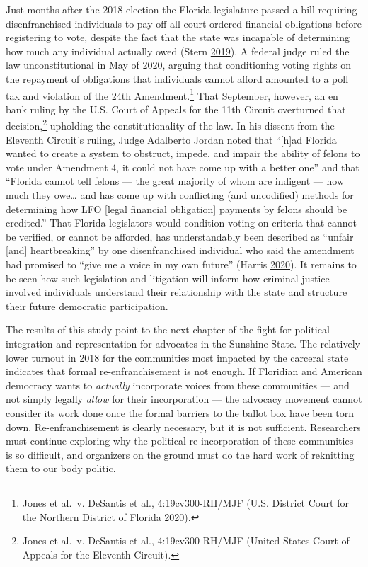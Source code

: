 \documentclass[
  12pt,
]{article}
\begin{document}
Just months after the 2018 election the Florida legislature passed a bill requiring disenfranchised individuals to pay off all court-ordered financial obligations before registering to vote, despite the fact that the state was incapable of determining how much any individual actually owed (Stern \protect\hyperlink{ref-Stern2019}{2019}). A federal judge ruled the law unconstitutional in May of 2020, arguing that conditioning voting rights on the repayment of obligations that individuals cannot afford amounted to a poll tax and violation of the 24th Amendment.\footnote{Jones et al.~v. DeSantis et al., 4:19cv300-RH/MJF (U.S. District Court for the Northern District of Florida 2020).} That September, however, an en bank ruling by the U.S. Court of Appeals for the 11th Circuit overturned that decision,\footnote{Jones et al.~v. DeSantis et al., 4:19cv300-RH/MJF (United States Court of Appeals for the Eleventh Circuit).} upholding the constitutionality of the law. In his dissent from the Eleventh Circuit's ruling, Judge Adalberto Jordan noted that ``{[}h{]}ad Florida wanted to create a system to obstruct, impede, and impair the ability of felons to vote under Amendment 4, it could not have come up with a better one'' and that ``Florida cannot tell felons --- the great majority of whom are indigent --- how much they owe\ldots{} and has come up with conflicting (and uncodified) methods for determining how LFO {[}legal financial obligation{]} payments by felons should be credited.'' That Florida legislators would condition voting on criteria that cannot be verified, or cannot be afforded, has understandably been described as ``unfair {[}and{]} heartbreaking'' by one disenfranchised individual who said the amendment had promised to ``give me a voice in my own future'' (Harris \protect\hyperlink{ref-Harris2020}{2020}). It remains to be seen how such legislation and litigation will inform how criminal justice-involved individuals understand their relationship with the state and structure their future democratic participation.

The results of this study point to the next chapter of the fight for political integration and representation for advocates in the Sunshine State. The relatively lower turnout in 2018 for the communities most impacted by the carceral state indicates that formal re-enfranchisement is not enough. If Floridian and American democracy wants to \emph{actually} incorporate voices from these communities --- and not simply legally \emph{allow} for their incorporation --- the advocacy movement cannot consider its work done once the formal barriers to the ballot box have been torn down. Re-enfranchisement is clearly necessary, but it is not sufficient. Researchers must continue exploring why the political re-incorporation of these communities is so difficult, and organizers on the ground must do the hard work of reknitting them to our body politic.
\end{document}
